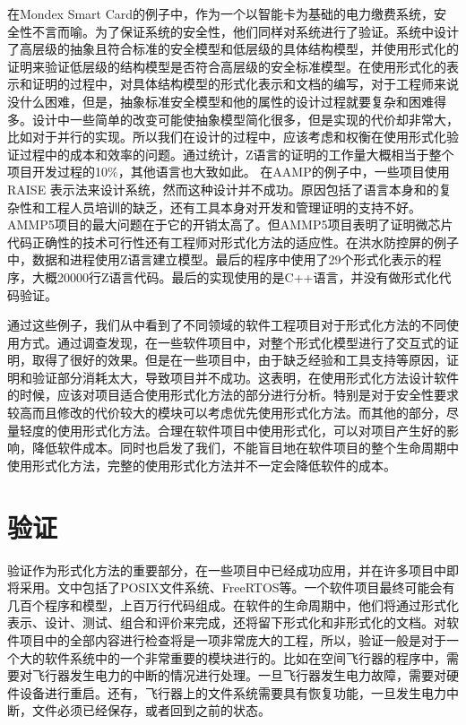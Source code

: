 \documentclass{article}
\begin{document}
\begin{CJK}{UTF8}{gbsn}
\begin{spacing}{1.4}
在Mondex Smart Card的例子中，作为一个以智能卡为基础的电力缴费系统，安全性不言而喻。为了保证系统的安全性，他们同样对系统进行了验证。系统中设计了高层级的抽象且符合标准的安全模型和低层级的具体结构模型，并使用形式化的证明来验证低层级的结构模型是否符合高层级的安全标准模型。在使用形式化的表示和证明的过程中，对具体结构模型的形式化表示和文档的编写，对于工程师来说没什么困难，但是，抽象标准安全模型和他的属性的设计过程就要复杂和困难得多。设计中一些简单的改变可能使抽象模型简化很多，但是实现的代价却非常大，比如对于并行的实现。所以我们在设计的过程中，应该考虑和权衡在使用形式化验证过程中的成本和效率的问题。通过统计，Z语言的证明的工作量大概相当于整个项目开发过程的10\%，其他语言也大致如此。
在AAMP的例子中，一些项目使用RAISE 表示法来设计系统，然而这种设计并不成功。原因包括了语言本身和的复杂性和工程人员培训的缺乏，还有工具本身对开发和管理证明的支持不好。AMMP5项目的最大问题在于它的开销太高了。但AMMP5项目表明了证明微芯片代码正确性的技术可行性还有工程师对形式化方法的适应性。在洪水防控屏的例子中，数据和进程使用Z语言建立模型。最后的程序中使用了29个形式化表示的程序，大概20000行Z语言代码。最后的实现使用的是C++语言，并没有做形式化代码验证。

  通过这些例子，我们从中看到了不同领域的软件工程项目对于形式化方法的不同使用方式。通过调查发现，在一些软件项目中，对整个形式化模型进行了交互式的证明，取得了很好的效果。但是在一些项目中，由于缺乏经验和工具支持等原因，证明和验证部分消耗太大，导致项目并不成功。这表明，在使用形式化方法设计软件的时候，应该对项目适合使用形式化方法的部分进行分析。特别是对于安全性要求较高而且修改的代价较大的模块可以考虑优先使用形式化方法。而其他的部分，尽量轻度的使用形式化方法。合理在软件项目中使用形式化，可以对项目产生好的影响，降低软件成本。同时也启发了我们，不能盲目地在软件项目的整个生命周期中使用形式化方法，完整的使用形式化方法并不一定会降低软件的成本。
\section{验证}
验证作为形式化方法的重要部分，在一些项目中已经成功应用，并在许多项目中即将采用。文中包括了POSIX文件系统、FreeRTOS等。一个软件项目最终可能会有几百个程序和模型，上百万行代码组成。在软件的生命周期中，他们将通过形式化表示、设计、测试、组合和评价来完成，还将留下形式化和非形式化的文档。对软件项目中的全部内容进行检查将是一项非常庞大的工程，所以，验证一般是对于一个大的软件系统中的一个非常重要的模块进行的。比如在空间飞行器的程序中，需要对飞行器发生电力的中断的情况进行处理。一旦飞行器发生电力故障，需要对硬件设备进行重启。还有，飞行器上的文件系统需要具有恢复功能，一旦发生电力中断，文件必须已经保存，或者回到之前的状态。

\end{spacing}
\end{CJK}
\end{document}
